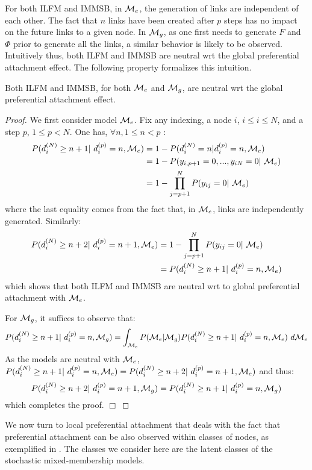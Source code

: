 For both ILFM and IMMSB, in $\mathcal{M}_e$, the generation of links are independent of each other. The fact that $n$ links have been created after $p$ steps has no impact on the future links to a given node. In $\mathcal{M}_g$, as one first needs to generate $F$ and $\Phi$ prior to generate all the links, a similar behavior is likely to be observed. Intuitively thus, both ILFM and IMMSB are neutral wrt the global preferential attachment effect. The following property formalizes this intuition.
%
\begin{proposition} \label{th:mg_glob}
Both ILFM and IMMSB, for both $\mathcal{M}_e$ and $\mathcal{M}_g$, are neutral wrt the global preferential attachment effect.
\end{proposition}
%
\begin{proof}
We first consider model $\mathcal{M}_e$. Fix any indexing, a node $i$, $i \leq i \leq N$, and a step $p$, $1 \leq p < N$. One has, $\forall n, 1 \leq n < p$ :
%
\begin{align*}
P(d_i^{(N)} \geq n+1 | d_i^{(p)}=n, \M_e) &= 1 - P(d_i^{(N)}=n | d_i^{(p)}=n, \M_e) \\
        &= 1 -P(y_{i,p+1}=0, ...,y_{iN}=0 | \M_e ) \\
        &= 1 - \prod_{j=p+1}^N P(y_{ij}=0 | \M_e)
\end{align*}
%
where the last equality comes from the fact that, in $\mathcal{M}_e$, links are independently generated. Similarly:
%
\begin{align*}
P(d_i^{(N)} \geq n+2 | d_i^{(p)}=n+1, \M_e) &= 1 - \prod_{j=p+1}^N P(y_{ij}=0 | \M_e) \\
                    &=P(d_i^{(N)} \geq n+1 | d_i^{(p)}=n, \M_e)
\end{align*}
%
which shows that both ILFM and IMMSB are neutral wrt to global preferential attachment with $\mathcal{M}_e$.

For $\mathcal{M}_g$, it suffices to observe that:
%
\begin{equation*}
P(d_i^{(N)} \geq n+1 | d_i^{(p)}=n, \M_g)  = \int_{\M_e} P(\M_e|\M_g) P(d_i^{(N)} \geq n+1 | d_i^{(p)}=n, \M_e) \ d\M_e
\end{equation*}
%
As the models are neutral with $\mathcal{M}_e$, $P(d_i^{(N)} \geq n+1 | d_i^{(p)}=n, \M_e) = P(d_i^{(N)} \geq n+2 | d_i^{(p)}=n+1, \M_e)$ and thus:
%
\begin{equation*}
P(d_i^{(N)} \geq n+2 | d_i^{(p)}=n+1, \M_g) = P(d_i^{(N)} \geq n+1 | d_i^{(p)}=n, \M_g)
\end{equation*}
%
which completes the proof. \hspace{11cm} $\Box$
\end{proof}
%
We now turn to local preferential attachment that deals with the fact that preferential attachment can be also observed within classes of nodes, as exemplified in \cite{LeskovecBKT08}. The classes we consider here are the latent classes of the stochastic mixed-membership models.


